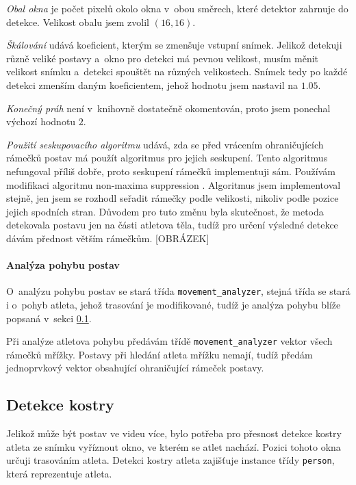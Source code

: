 \emph{Obal okna} je počet pixelů okolo okna v~obou směrech, které detektor zahrnuje do detekce. Velikost obalu jsem zvolil $(16,16)$.

\emph{Škálování} udává koeficient, kterým se zmenšuje vstupní snímek. Jelikož detekuji různě veliké postavy a~okno pro detekci má pevnou velikost, musím měnit velikost snímku a~detekci spouštět na různých velikostech. Snímek tedy po každé detekci zmenším daným koeficientem, jehož hodnotu jsem nastavil na $1.05$.

\emph{Konečný práh} není v~knihovně dostatečně okomentován, proto jsem ponechal výchozí hodnotu $2$.

\emph{Použití seskupovacího algoritmu} udává, zda se před vrácením ohraničujících rámečků postav má použít algoritmus pro jejich seskupení. Tento algoritmus nefungoval příliš dobře, proto seskupení rámečků implementuji sám. Používám modifikaci algoritmu non-maxima suppression \citep{NMS}. Algoritmus jsem implementoval stejně, jen jsem se rozhodl seřadit rámečky podle velikosti, nikoliv podle pozice jejich spodních stran. Důvodem pro tuto změnu byla skutečnost, že metoda detekovala postavu jen na části atletova těla, tudíž pro určení výsledné detekce dávám přednost větším rámečkům. [OBRÁZEK]

\paragraph{Analýza pohybu postav}

O~analýzu pohybu postav se stará třída \texttt{movement\_analyzer}, stejná třída se stará i o~pohyb atleta, jehož trasování je modifikované, tudíž je analýza pohybu blíže popsaná v~sekci \ref{ssec:detekce}.

Při analýze atletova pohybu předávám třídě \texttt{movement\_analyzer} vektor všech rámečků mřížky. Postavy při hledání atleta mřížku nemají, tudíž předám jednoprvkový vektor obsahující ohraničující rámeček postavy.



\subsection{Detekce kostry}
\label{ssec:detekce}

Jelikož může být postav ve videu více, bylo potřeba pro přesnost detekce kostry atleta ze snímku vyříznout okno, ve kterém se atlet nachází. Pozici tohoto okna určuji trasováním atleta. Detekci kostry atleta zajišťuje instance třídy \texttt{person}, která reprezentuje atleta.

